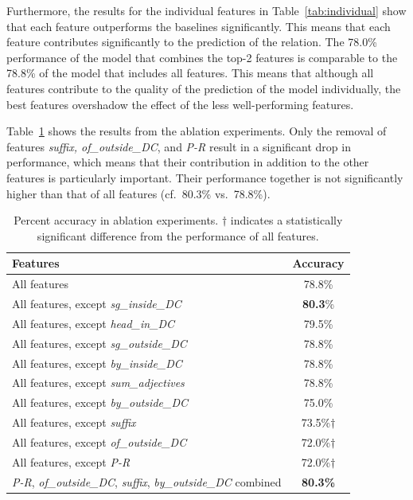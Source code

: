\documentclass[output=paper]{langsci/langscibook}
\begin{document}
Furthermore, the results for the individual features in Table~\ref{tab:individual} show that each feature outperforms the baselines significantly. This means that each feature contributes significantly to the prediction of the relation. The  {78.0\%} performance of the model that combines the top-2 features is comparable to the  {78.8\% of the} model that includes all features. This means that although all features contribute to the quality of the prediction of the model individually, the best features overshadow the effect of the less well-performing features. 


Table~\ref{tab:ablation:3As} shows the results from the ablation experiments. Only the removal of features \textit{suffix, of\_outside\_DC}, and \textit{P-R} result in a significant drop in performance, which means that their contribution in addition to the other features is particularly important.  {Their performance together is not significantly higher than that of all features (cf.~80.3\% vs.~78.8\%).} 

\begin{table}
\caption{\label{tab:ablation:3As}Percent accuracy in ablation experiments. $\dagger$ indicates a statistically significant difference from the performance of all features.}
{\small \begin{tabular}{lc}
\textbf{Features}&\textbf{Accuracy}\\
\hline
All features&78.8\%\\
All features, except \textit{sg\_inside\_DC}&\textbf{80.3}\%\\
All features, except \textit{head\_in\_DC}&79.5\%\\
All features, except \textit{sg\_outside\_DC}&78.8\%\\
All features, except \textit{by\_inside\_DC} &78.8\%\\
All features, except \textit{sum\_adjectives}& 78.8\%\\
All features, except \textit{by\_outside\_DC}& 75.0\%\\
All features, except \textit{suffix}&73.5\%$\dagger$\\
All features, except \textit{of\_outside\_DC}&72.0\%$\dagger$\\
All features, except \textit{P-R}&72.0\%$\dagger$\\
\textit{P-R}, \textit{of\_outside\_DC}, \textit{suffix}, \textit{by\_outside\_DC} combined&\textbf{80.3\%}\\
\end{tabular}}
\end{table}
\end{document}
